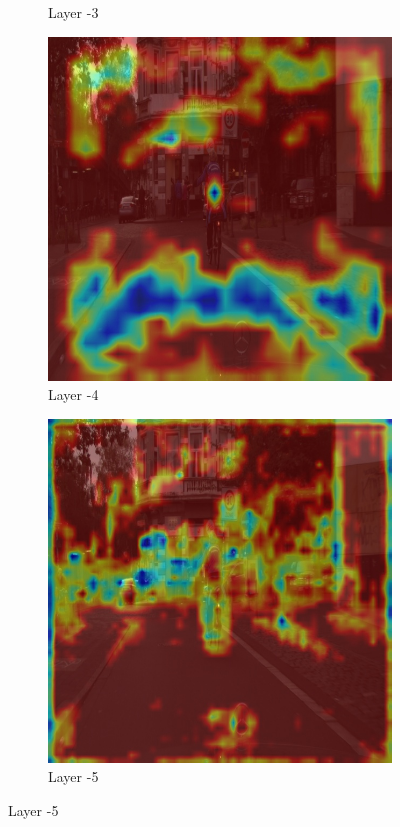 \begin{figure}[h]
\begin{subfigure}[b]{0.2\textwidth}
        \caption{Layer -3}
        \label{fig:b-3}
    \end{subfigure}
    \hfill
    \begin{subfigure}[b]{0.2\textwidth}
        \centering
        \includegraphics[width=\textwidth]{figures/bonn_000036_000019_leftImg8bit.pnglayer-4/bonn_000036_000019_leftImg8bit.png_object(0)_heatmap}
        \caption{Layer -4}
        \label{fig:b-4}
    \end{subfigure}
    \hfill
    \begin{subfigure}[b]{0.2\textwidth}
        \centering
        \includegraphics[width=\textwidth]{figures/bonn_000036_000019_leftImg8bit.pnglayer-5/bonn_000036_000019_leftImg8bit.png_object(0)_heatmap}
        \caption{Layer -5}
        \label{fig:b-5}
    \end{subfigure}
    \hfill


\end{figure}
